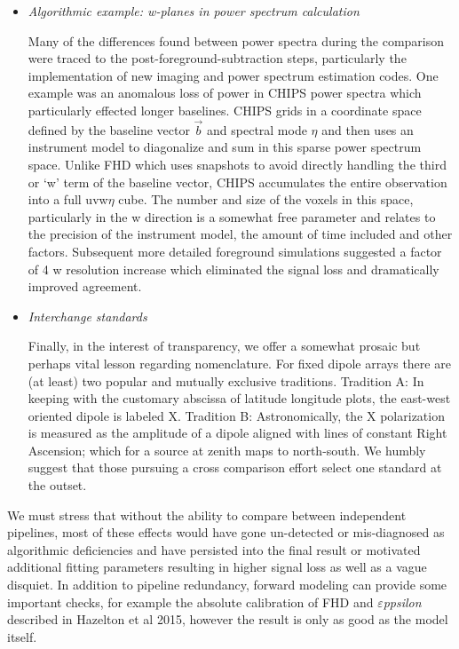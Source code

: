 \documentclass[twolcolumn,iop]{emulateapj}
\def\eppsilon{{\it $\varepsilon$ppsilon}}
\def\eppsiloncite{Hazelton et al 2015}
\begin{document}
\begin{itemize}
\item \emph{Algorithmic example: w-planes in power spectrum calculation}


Many of the differences found between power spectra during the comparison were traced to the post-foreground-subtraction steps, particularly the implementation of new imaging and power spectrum estimation codes.  One example was an anomalous loss of power in CHIPS power spectra which particularly effected longer baselines.  CHIPS grids in a coordinate space defined by the baseline vector $\vec{b}$ and spectral mode $\eta$ and then uses an instrument model to diagonalize and sum in this sparse power spectrum space.  Unlike FHD which uses snapshots to avoid directly handling the third or `w' term of the baseline vector, CHIPS accumulates the entire observation into a full uvw$\eta$ cube.  The number and size of the voxels in this space, particularly in the w direction is a somewhat free parameter and relates to the precision of the instrument model, the amount of time included and other factors.  Subsequent more detailed foreground simulations suggested a factor of 4 w resolution increase which eliminated the signal loss and dramatically improved agreement.


\item \emph{Interchange standards}

Finally, in the interest of transparency, we offer a somewhat prosaic but perhaps vital lesson regarding  nomenclature. For fixed dipole arrays there are (at least) two popular and mutually exclusive traditions. Tradition A: In keeping with the customary abscissa of latitude longitude plots, the east-west oriented dipole is labeled X.  Tradition B: Astronomically, the X polarization is measured as the amplitude of a dipole aligned with lines of constant Right Ascension; which for a source at zenith maps to north-south. We humbly suggest that those pursuing a cross comparison effort select one standard at the outset.  

\end{itemize}






  We must stress that without the ability to compare between independent pipelines, most of these effects would have gone un-detected or mis-diagnosed as algorithmic deficiencies and have persisted into the final result or motivated additional fitting parameters resulting in higher signal loss as well as a vague disquiet. In addition to pipeline redundancy, forward modeling can provide some important checks, for example the absolute calibration of FHD and \eppsilon{} described in \eppsiloncite{}, however the result is only as good as the model itself.
  
\end{document}

